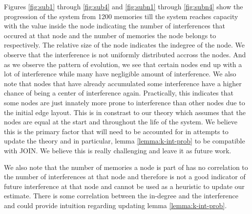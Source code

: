 Figures \ref{fig:sub1} through \ref{fig:sub4} and \ref{fig:subn1} through \ref{fig:subn4} show the progression of the system from 1200 memories till the system reaches capacity with the value inside the node indicating the number of interferences that occured at that node and the number of memories the node belongs to respectively. The relative size of the node indicates the indegree of the node.  We observe that the interference is not uniformly distributed accross the nodes. And as we observe the pattern of evolution, we see that certain nodes end up with a lot of interference while many have negligible amount of interference. We also note that nodes that have already accumulated some interference have a higher chance of being a center of interference again. Practically, this indicates that some nodes are just innately more prone to interference than other nodes due to the initial edge layout. This is in constrast to our theory which assumes that the nodes are equal at the start and throughout the life of the system. We believe this is the primary factor that will need to be accounted for in attempts to update the theory and in particular, lemma \ref{lemma:k-int-prob} to be compatible with JOIN. We believe this is really challenging and leave it as future work. 

We also note that the number of memories a node is part of has no correlation to the number of interferences at that node and therefore is not a good indicator of future interference at that node and cannot be used as a heuristic to update our estimate. There is some correlation between the in-degree and the interference and could provide intuition regarding updating lemma \ref{lemma:k-int-prob}. 












